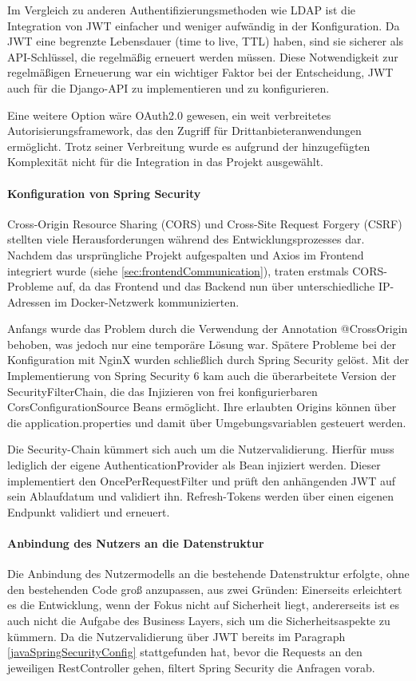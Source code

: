 Im Vergleich zu anderen Authentifizierungsmethoden wie LDAP ist die Integration von JWT einfacher und weniger aufwändig in der Konfiguration. Da JWT eine begrenzte Lebensdauer (time to live, TTL) haben, sind sie sicherer als API-Schlüssel, 
die regelmäßig erneuert werden müssen. Diese Notwendigkeit zur regelmäßigen Erneuerung war ein wichtiger Faktor bei der Entscheidung, JWT auch für die Django-API zu implementieren und zu konfigurieren.

Eine weitere Option wäre OAuth2.0 gewesen, ein weit verbreitetes Autorisierungsframework, das den Zugriff für Drittanbieteranwendungen ermöglicht. Trotz seiner Verbreitung wurde es aufgrund der hinzugefügten Komplexität nicht für die Integration in das Projekt ausgewählt.

\paragraph{Konfiguration von Spring Security}
\label{sec:javaSpringSecurityConfig}
Cross-Origin Resource Sharing (CORS) und Cross-Site Request Forgery (CSRF) stellten viele Herausforderungen während des Entwicklungsprozesses dar. Nachdem das ursprüngliche Projekt aufgespalten und Axios im Frontend integriert wurde 
(siehe \ref{sec:frontendCommunication}), traten erstmals CORS-Probleme auf, da das Frontend und das Backend nun über unterschiedliche IP-Adressen im Docker-Netzwerk kommunizierten.

Anfangs wurde das Problem durch die Verwendung der Annotation @CrossOrigin behoben, was jedoch nur eine temporäre Lösung war. Spätere Probleme bei der Konfiguration mit NginX wurden schließlich durch Spring Security gelöst. Mit der Implementierung von 
Spring Security 6 kam auch die überarbeitete Version der SecurityFilterChain, die das Injizieren von frei konfigurierbaren CorsConfigurationSource Beans ermöglicht. Ihre erlaubten Origins können über die application.properties und damit über Umgebungsvariablen gesteuert werden.

Die Security-Chain kümmert sich auch um die Nutzervalidierung. Hierfür muss lediglich der eigene AuthenticationProvider als Bean injiziert werden. Dieser implementiert den OncePerRequestFilter und prüft den anhängenden JWT auf sein Ablaufdatum und validiert ihn.
Refresh-Tokens werden über einen eigenen Endpunkt validiert und erneuert.

\paragraph{Anbindung des Nutzers an die Datenstruktur}
Die Anbindung des Nutzermodells an die bestehende Datenstruktur erfolgte, ohne den bestehenden Code groß anzupassen, aus zwei Gründen: Einerseits erleichtert es die Entwicklung, wenn der Fokus nicht auf Sicherheit liegt, andererseits ist es auch nicht die 
Aufgabe des Business Layers, sich um die Sicherheitsaspekte zu kümmern. Da die Nutzervalidierung über JWT bereits im Paragraph \ref{javaSpringSecurityConfig} stattgefunden hat, bevor die Requests an den jeweiligen RestController gehen, filtert Spring Security die Anfragen vorab.

